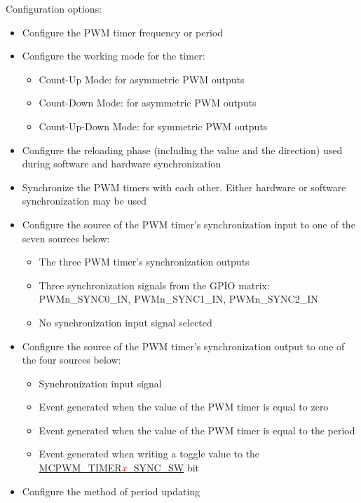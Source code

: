 \documentclass[main\_\_EN.tex]{subfiles}
\begin{document}
Configuration options:
\begin{itemize}
    \item Configure the PWM timer frequency or period
    \item Configure the working mode for the timer:
        \begin{itemize}
            \item Count-Up Mode: for asymmetric PWM outputs
            \item Count-Down Mode: for asymmetric PWM outputs
            \item Count-Up-Down Mode: for symmetric PWM outputs
        \end{itemize}
    \item Configure the reloading phase (including the value and the direction) used during software and hardware synchronization
    \item Synchronize the PWM timers with each other. Either hardware or software synchronization may be used
    \item Configure the source of the PWM timer's synchronization input to one of the seven sources below: 
        \begin{itemize}
            \item The three PWM timer's synchronization outputs
            \item Three synchronization signals from the GPIO matrix: PWMn\_SYNC0\_IN, PWMn\_SYNC1\_IN, PWMn\_SYNC2\_IN
            \item No synchronization input signal selected
        \end{itemize}
    \item Configure the source of the PWM timer's synchronization output to one of the four sources below: 
        \begin{itemize}
            \item Synchronization input signal
            \item Event generated when the value of the PWM timer is equal to zero
            \item Event generated when the value of the PWM timer is equal to the period
            \item Event generated when writing a toggle value to the \hyperref[fielddesc:MCPWMTIMER0SYNCSW]{MCPWM\_TIMER\textcolor{red}{\it{x}}\_SYNC\_SW} bit
        \end{itemize}
    \item Configure the method of period updating
\end{itemize}
\end{document}
